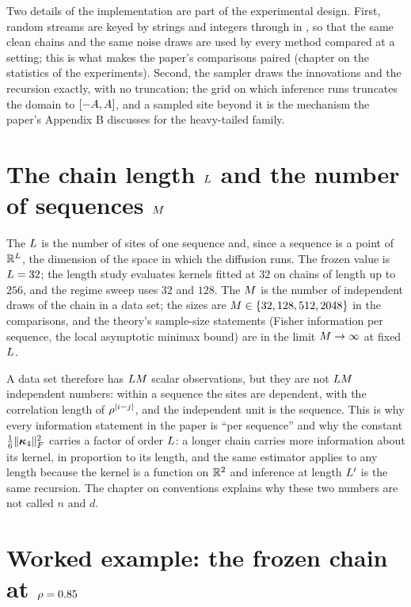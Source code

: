 Two details of the implementation are part of the experimental design. First, random
streams are keyed by strings and integers through  in
, so that the same clean chains and the same noise
draws are used by every method compared at a setting; this is what makes the paper's
comparisons paired (chapter on the statistics of the experiments). Second, the
sampler draws the innovations and the recursion exactly, with no truncation; the
grid on which inference runs truncates the domain to $[-A,A]$, and a
sampled site beyond it is the mechanism the paper's Appendix B discusses for the
heavy-tailed family.

\section{The chain length $L$ and the number of sequences $M$}

The  $L$ is the number of sites of one sequence and, since a
sequence is a point of $\mathbb{R}^{L}$, the dimension of the space in which the
diffusion runs. The frozen value is $L=32$; the length study evaluates kernels
fitted at $32$ on chains of length up to $256$, and the regime sweep uses $32$ and
$128$. The  $M$ is the number of independent draws of
the chain in a data set; the sizes are $M\in\{32,128,512,2048\}$ in the
comparisons, and the theory's sample-size statements (Fisher information per
sequence, the local asymptotic minimax bound) are in the limit $M\to\infty$ at
fixed $L$.

A data set therefore has $LM$ scalar observations, but they are not
$LM$ independent numbers: within a sequence the sites are dependent, with
the correlation length of $\rho^{|i-j|}$, and the independent unit is the sequence.
This is why every information statement in the paper is ``per sequence'' and why the
constant $\tfrac16\lVert \bm{\kappa}_4 \rVert_{F}^2$ carries a factor of order $L$: a longer chain
carries more information about its kernel, in proportion to its length, and the
same estimator applies to any length because the kernel is a function on $\mathbb{R}^2$
and inference at length $L'$ is the same recursion. The chapter on conventions
explains why these two numbers are not called $n$ and $d$.

\section{Worked example: the frozen chain at $\rho=0.85$}

